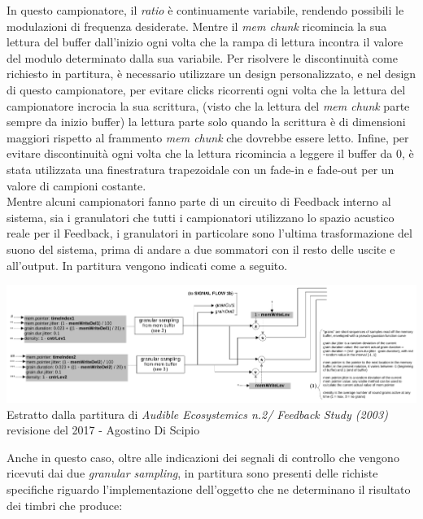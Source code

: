 In questo campionatore, il \textit{ratio} è continuamente variabile, 
rendendo possibili le modulazioni di frequenza desiderate. 
Mentre il \textit{mem chunk} ricomincia la sua lettura del buffer dall'inizio 
ogni volta che la rampa di lettura incontra il valore del modulo determinato dalla sua variabile.
Per risolvere le discontinuità come richiesto in partitura, 
è necessario utilizzare un design personalizzato,
e nel design di questo campionatore, 
per evitare clicks ricorrenti ogni volta che la lettura del campionatore incrocia la sua scrittura, 
(visto che la lettura del \textit{mem chunk} parte sempre da inizio buffer)
la lettura parte solo quando la scrittura è di dimensioni maggiori rispetto al frammento \textit{mem chunk} 
che dovrebbe essere letto.
Infine, per evitare discontinuità ogni volta che la lettura ricomincia a leggere il buffer da 0, 
è stata utilizzata una finestratura trapezoidale con un fade-in e fade-out 
per un valore di campioni costante. \\
Mentre alcuni campionatori fanno parte di un circuito di Feedback interno al sistema, 
sia i granulatori che tutti i campionatori utilizzano lo spazio acustico reale per il Feedback,
i granulatori in particolare sono l'ultima trasformazione del suono del sistema, prima di andare a 
due sommatori con il resto delle uscite e all'output.
In partitura vengono indicati come a seguito.

\begin{center}
    \includegraphics[width=14cm]{figures/GRANULATORSFeedbackstudy2017.pdf} \\
    {Estratto dalla partitura di \textit{Audible Ecosystemics n.2/ Feedback Study (2003)} \\
    revisione del 2017 - Agostino Di Scipio} \\ 
    \vspace{0.5cm}
\end{center}

Anche in questo caso, oltre alle indicazioni dei segnali di controllo che vengono
ricevuti dai due \textit{granular sampling}, 
in partitura sono presenti delle richiste specifiche riguardo l'implementazione 
dell'oggetto che ne determinano il risultato dei timbri che produce: 

